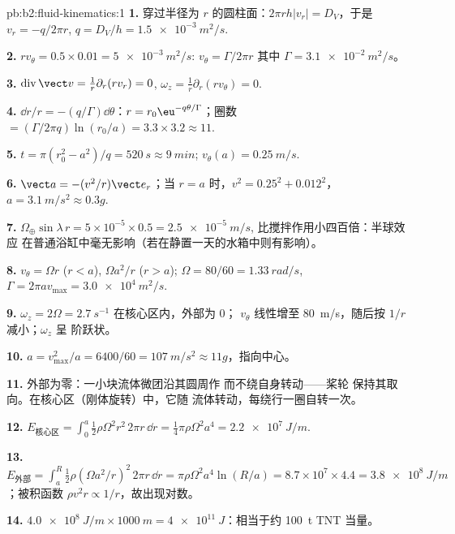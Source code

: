 \begin{solution}{pb:b2:fluid-kinematics:1}
\textbf{1.} 穿过半径为 $r$ 的圆柱面：$2\pi rh|v_r| = D_V$，于是
$v_r = -q/2\pi r$, $q = D_V/h = \qty{1.5e-3}{m^2/s}$.

\textbf{2.} $rv_\theta = 0.5 \times 0.01 = \qty{5e-3}{m^2/s}$: $v_\theta = \Gamma/2\pi r$
其中 $\Gamma = \qty{3.1e-2}{m^2/s}$。

\textbf{3.} $\operatorname{div}\vect v = \frac1r\partial_r(rv_r) = 0$, $\omega_z =
\frac1r\partial_r(rv_\theta) = 0$.

\textbf{4.} $\dd r/r = -(q/\Gamma)\dd\theta$：$r = r_0\eu^{-q\theta/\Gamma}$；圈数
$= (\Gamma/2\pi q)\ln(r_0/a) = 3.3 \times 3.2 \approx 11$.

\textbf{5.} $t = \pi(r_0^2 - a^2)/q = \qty{520}{s} \approx \qty{9}{min}$; $v_\theta(a) =
\qty{0.25}{m/s}$.

\textbf{6.} $\vect a = -(v^2/r)\vect e_r$；当 $r = a$ 时，$v^2 = 0.25^2 + 0.012^2$，
$a = \qty{3.1}{m/s^2} \approx 0.3g$.

\textbf{7.} $\Omega_\oplus\sin\lambda\,r = 5 \times 10^{-5} \times 0.5 = \qty{2.5e-5}{m/s}$,
比搅拌作用小四百倍：半球效应
在普通浴缸中毫无影响（若在静置一天的水箱中则有影响）。

\textbf{8.} $v_\theta = \Omega r$ ($r < a$), $\Omega a^2/r$ ($r > a$); $\Omega = 80/60
= \qty{1.33}{rad/s}$, $\Gamma = 2\pi av_{\max} = \qty{3.0e4}{m^2/s}$.

\textbf{9.} $\omega_z = 2\Omega = \qty{2.7}{s^{-1}}$ 在核心区内，外部为 $0$；
$v_\theta$ 线性增至 \qty{80}{m/s}，随后按 $1/r$ 减小；$\omega_z$ 呈
阶跃状。

\textbf{10.} $a = v_{\max}^2/a = 6400/60 = \qty{107}{m/s^2} \approx 11g$，指向中心。

\textbf{11.} 外部为零：一小块流体微团沿其圆周作
而不绕自身转动——桨轮
保持其取向。在核心区（刚体旋转）中，它随
流体转动，每绕行一圈自转一次。

\textbf{12.} $E_{\text{核心区}} = \int_0^a\tfrac12\rho\Omega^2r^2\,2\pi r\,\dd r =
\tfrac14\pi\rho\Omega^2a^4 = \qty{2.2e7}{J/m}$.

\textbf{13.} $E_{\text{外部}} = \int_a^R\tfrac12\rho(\Omega a^2/r)^2\,2\pi r\,\dd r =
\pi\rho\Omega^2a^4\ln(R/a) = 8.7 \times 10^7 \times 4.4 = \qty{3.8e8}{J/m}$；被积函数
$\rho v^2r \propto 1/r$，故出现对数。

\textbf{14.} $\qty{4.0e8}{J/m} \times \qty{1000}{m} = \qty{4e11}{J}$：相当于约
\qty{100}{t} TNT 当量。


\end{solution}
